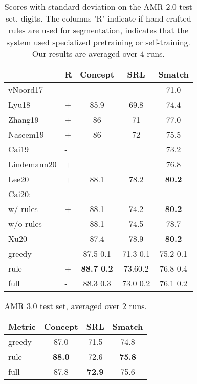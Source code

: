 \documentclass[11pt]{article}
\begin{document}
\begin{table}[t!] 
   \begin{center} \setlength\tabcolsep{3pt} 
          \begin{tabular}{llccc} 
   \hline   
          & R &   Concept & SRL &  Smatch  \\\hline
    vNoord17  & - &  &  & 71.0 \\      
    Lyu18 &  +   & 85.9  &69.8&74.4\\
  Zhang19  & +    & 86  &71& 77.0\\
   Naseem19  & +    & 86 &72&75.5\\
   Cai19 & - & &  &   73.2 \\
   Lindemann20  & +  &   & & 76.8\\
   Lee20  & +    & 88.1  &78.2 & \bf 80.2\\
 Cai20: \\ 
 \quad w/ rules & +   & 88.1 & 74.2& \bf80.2\\
 \quad w/o rules & -   & 88.1 & 74.5&  78.7\\
 Xu20  &  - & 87.4 & 78.9 & \bf 80.2  \\


     \hline
      greedy  & -   & 87.5   \small  0.1& 71.3 \small 0.1 & 75.2 \small  0.1\\
     rule    & + & \bf 88.7 \small  0.2  &  73.6\small  0.2  & 76.8 \small  0.4\\
  full     &  - &  88.3 \small  0.3 & 73.0 \small  0.2& 76.1 \small  0.2\\ \hline
        \end{tabular}
    \end{center}
    \vspace{-2ex}
	\caption{\label{table:sota} Scores with standard deviation on the AMR 2.0 test set.  digits.  The columns 'R' indicate if hand-crafted rules are used for segmentation,  indicates that the system used specialized pretraining or self-training.  Our results are averaged over 4 runs. }
\end{table}

\begin{table}[t!] 
   \begin{center} \setlength\tabcolsep{3pt} 
     \begin{tabular}{lccc} 
   \hline 
        Metric  &   Concept & SRL &  Smatch \\\hline
         greedy    &87.0& 71.5& 74.8 \\
        rule    & \bf 88.0 & 72.6 &\bf 75.8 \\
     full     &  87.8  &\bf 72.9 & 75.6 \\ \hline
        \end{tabular}
    \end{center}
    \vspace{-2ex}
	\caption{\label{table:sota3}  AMR 3.0 test set, averaged over 2 runs.
    }
\end{table}
\end{document}
